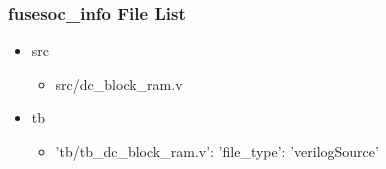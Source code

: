\subsubsection{fusesoc\_info File List}
\begin{itemize}
\item src
	\begin{itemize}
	\item src/dc\_block\_ram.v
	\end{itemize}
\item tb
	\begin{itemize}
	\item {'tb/tb\_dc\_block\_ram.v': {'file\_type': 'verilogSource'}}
	\end{itemize}
\end{itemize}
